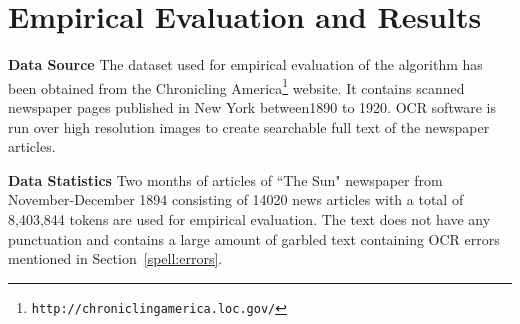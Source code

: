 \documentclass[preprint,11pt]{elsarticle}
\begin{document}
\section{Empirical Evaluation and Results}
\label{spell:results}

\noindent \textbf{Data Source} 
The dataset used for empirical evaluation of the algorithm has been obtained from the Chronicling America\footnote{\texttt{http://chroniclingamerica.loc.gov/}} website. It contains scanned newspaper pages published in New York between1890 to 1920. OCR software is run over high
resolution images to create searchable full text of the newspaper articles.


\noindent \textbf{Data Statistics }%
Two months of articles of ``The Sun" newspaper from November-December 1894 consisting of 14020 news articles with a total of 8,403,844 tokens are used for empirical evaluation. %
The text does not have any punctuation and contains a large amount of garbled text containing OCR errors mentioned in Section~\ref{spell:errors}.
\end{document}
